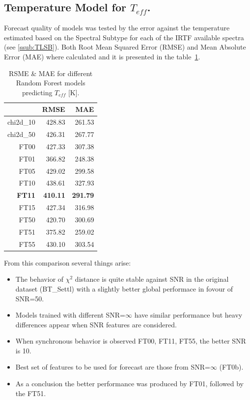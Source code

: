 \subsection{Temperature Model for $T_{eff}$.}
\label {ssub:teff_model}

Forecast quality of models was tested by the error against the temperature 
estimated based on the Spectral Subtype for each of 
the IRTF available spectra (see \ref{ssub:TLSB}).
Both Root Mean Squared Error (RMSE) and Mean Absolute Error (MAE) where calculated 
and it is presented in the table~\ref{tab:model_Tvar}.

\begin{table}[ht]
\centering
\begin{tabular}{rrr}
  \hline
 & RMSE & MAE \\ 
  \hline
chi2d\_10 & 428.83 & 261.53 \\ 
  chi2d\_50 & 426.31 & 267.77 \\ 
  FT00 & 427.33 & 307.38 \\ 
  FT01 & 366.82 & 248.38 \\ 
  FT05 & 429.02 & 299.58 \\ 
  FT10 & 438.61 & 327.93 \\ 
  \textbf{FT11} & \textbf{410.11} & \textbf{291.79} \\ 
  FT15 & 427.34 & 316.98 \\ 
  FT50 & 420.70 & 300.69 \\ 
  FT51 & 375.82 & 259.02 \\ 
  FT55 & 430.10 & 303.54 \\ 
   \hline
\end{tabular}
\caption { RSME \& MAE for different Random Forest models predicting $T_{eff}$ [K].} 
\label{tab:model_Tvar} 
\end{table}

From this comparison several things arise:
\begin{itemize}
 \item {The behavior of $\chi^2$ distance is quite stable against SNR 
	in the original dataset (BT\_Settl) with a slightly better global 
	performace in fovour of SNR=50.}
 \item {Models trained with different SNR=$\infty$ have similar performance but heavy 
	differences appear when SNR features are considered.}
 \item {When synchronous behavior is observed FT00, FT11, FT55, the better SNR is 10.}
 \item {Best set of features to be used for forecast are those from SNR=$\infty$ (FT0b).}
 \item {As a conclusion the better performance was produced by FT01, followed by the FT51.}
\end{itemize}

